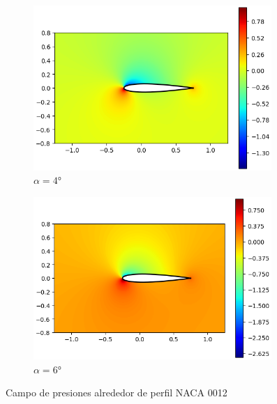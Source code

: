 \documentclass[letterpaper, openright, 12pt]{book}
\begin{document}
\begin{figure}[htbp!]
\begin{subfigure}[c]{0.48\textwidth}
            \includegraphics[keepaspectratio, width=0.99\textwidth]
                {./img/potential_flow_cp_4}
            \caption{$\alpha = 4\si{\degree}$}
            \label{fig:potential_flow_cp_4}
        \end{subfigure}
        \hfill
        \begin{subfigure}[c]{0.48\textwidth}
            \includegraphics[keepaspectratio, width=0.99\textwidth]
                {./img/potential_flow_cp_6}
            \caption{$\alpha = 6\si{\degree}$}
            \label{fig:potential_flow_cp_6}
        \end{subfigure}
        \caption{Campo de presiones alrededor de perfil NACA 0012}
        \label{fig:potential_flow_cp__0}
    \end{figure}
\end{document}
